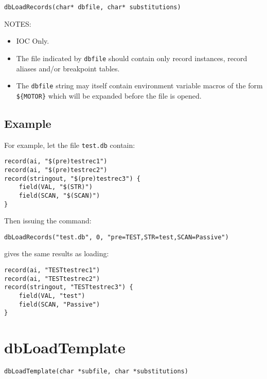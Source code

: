 \begin{verbatim}
dbLoadRecords(char* dbfile, char* substitutions)
\end{verbatim}

NOTES:

\begin{itemize}
\item IOC Only.

\item The file indicated by \verb|dbfile| should contain only record instances, record aliases and/or breakpoint tables.

\item The \verb|dbfile| string may itself contain environment variable macros of the form \verb|${MOTOR}| which will be 
expanded before the file is opened.

\end{itemize}

\subsection{Example}

For example, let the file \verb|test.db| contain:

\begin{verbatim}
record(ai, "$(pre)testrec1")
record(ai, "$(pre)testrec2")
record(stringout, "$(pre)testrec3") {
    field(VAL, "$(STR)")
    field(SCAN, "$(SCAN)")
}
\end{verbatim}

Then issuing the command:

\begin{verbatim}
dbLoadRecords("test.db", 0, "pre=TEST,STR=test,SCAN=Passive")
\end{verbatim}

gives the same results as loading:

\begin{verbatim}
record(ai, "TESTtestrec1")
record(ai, "TESTtestrec2")
record(stringout, "TESTtestrec3") {
    field(VAL, "test")
    field(SCAN, "Passive")
}
\end{verbatim}

\section{dbLoadTemplate}

\begin{verbatim}
dbLoadTemplate(char *subfile, char *substitutions)
\end{verbatim}

